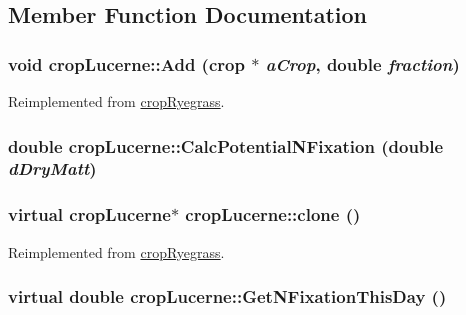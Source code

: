 \subsection{Member Function Documentation}
\hypertarget{classcrop_lucerne_afa12d3c07920dd3947636f3a7da8c4b4}{
\subsubsection[{Add}]{\setlength{\rightskip}{0pt plus 5cm}void cropLucerne::Add ({\bf crop} $\ast$ {\em aCrop}, \/  double {\em fraction})}}
\label{classcrop_lucerne_afa12d3c07920dd3947636f3a7da8c4b4}


Reimplemented from \hyperlink{classcrop_ryegrass_a3ee92e29d981a5bcae487e10f5aa18d4}{cropRyegrass}.\hypertarget{classcrop_lucerne_a1b79ced150076c79417cf1c1758bf1c4}{
\subsubsection[{CalcPotentialNFixation}]{\setlength{\rightskip}{0pt plus 5cm}double cropLucerne::CalcPotentialNFixation (double {\em dDryMatt})}}
\label{classcrop_lucerne_a1b79ced150076c79417cf1c1758bf1c4}
\hypertarget{classcrop_lucerne_a5060448bb250b985ad156fb25b368daa}{
\subsubsection[{clone}]{\setlength{\rightskip}{0pt plus 5cm}virtual {\bf cropLucerne}$\ast$ cropLucerne::clone ()}}
\label{classcrop_lucerne_a5060448bb250b985ad156fb25b368daa}


Reimplemented from \hyperlink{classcrop_ryegrass_af7eb9cc81f755e89fc1486cc242b8b84}{cropRyegrass}.\hypertarget{classcrop_lucerne_a427ff2efe93600382bfac05ec8b48365}{
\subsubsection[{GetNFixationThisDay}]{\setlength{\rightskip}{0pt plus 5cm}virtual double cropLucerne::GetNFixationThisDay ()}}
\label{classcrop_lucerne_a427ff2efe93600382bfac05ec8b48365}


